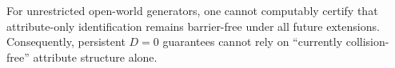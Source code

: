 \begin{corollary}[Certification consequence for persistent \texorpdfstring{$D=0$}{D=0} claims]
For unrestricted open-world generators, one cannot computably certify that attribute-only identification remains barrier-free under all future extensions. Consequently, persistent $D=0$ guarantees cannot rely on ``currently collision-free'' attribute structure alone.
\end{corollary}

